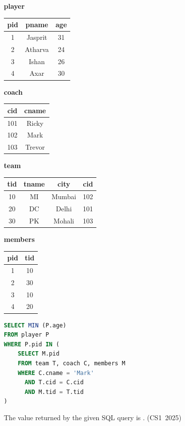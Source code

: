 \begin{enumerate}[label=\thesubsection.\arabic*, ref=\thesubsection.\theenumi]
\vspace{0.2cm}
\begin{minipage}{0.48\textwidth}
\textbf{player} \\
\begin{tabular}{|c|c|c|}
\hline
pid & pname & age \\ \hline
1 & Jasprit & 31 \\
2 & Atharva & 24 \\
3 & Ishan & 26 \\
4 & Axar & 30 \\ \hline
\end{tabular}
\end{minipage}
\begin{minipage}{0.48\textwidth}
\textbf{coach} \\
\begin{tabular}{|c|c|}
\hline
cid & cname \\ \hline
101 & Ricky \\
102 & Mark \\
103 & Trevor \\ \hline
\end{tabular}
\end{minipage}

\vspace{0.3cm}
\begin{minipage}{0.55\textwidth}
\textbf{team} \\
\begin{tabular}{|c|c|c|c|}
\hline
tid & tname & city & cid \\ \hline
10 & MI & Mumbai & 102 \\
20 & DC & Delhi & 101 \\
30 & PK & Mohali & 103 \\ \hline
\end{tabular}
\end{minipage}
\begin{minipage}{0.4\textwidth}
\textbf{members} \\
\begin{tabular}{|c|c|}
\hline
pid & tid \\ \hline
1 & 10 \\
2 & 30 \\
3 & 10 \\
4 & 20 \\ \hline
\end{tabular}
\end{minipage}

\vspace{0.3cm}
\begin{lstlisting}[language=SQL]
SELECT MIN (P.age)
FROM player P
WHERE P.pid IN (
    SELECT M.pid
    FROM team T, coach C, members M
    WHERE C.cname = 'Mark'
      AND T.cid = C.cid
      AND M.tid = T.tid
)
\end{lstlisting}
The value returned by the given SQL query is \underline{\hspace{1cm}}.
\hfill (CS1~2025)


\end{enumerate}
